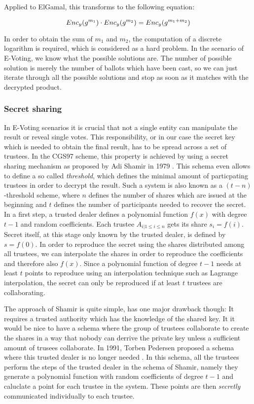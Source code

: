 \documentclass[numbers=noenddot, abstract=on]{scrreprt}
\begin{document}
Applied to ElGamal, this transforms to the following equation:

\begin{equation}
Enc_y(g^{m_1}) \cdot Enc_y(g^{m_2}) = Enc_y(g^{m_1 + m_2}) \notag
\end{equation}

In order to obtain the sum of $m_1$ and $m_2$, the computation of a discrete
logarithm is required, which is considered as a hard problem. In the scenario of
E-Voting, we know what the possible solutions are. The number of possible
solution is merely the number of ballots which have been cast, so we can just
iterate through all the possible solutions and stop as soon as it matches with
the decrypted product.


\subsubsection{Secret sharing}
\label{sec:secretsharing}
In E-Voting scenarios it is crucial that not a
single entity can manipulate the result or reveal single votes. This
responsibility, or in our case the secret key which is needed to obtain the
final result, has to be spread across a set of trustees. In the CGS97 scheme,
this property is achieved by using a secret sharing mechanism as proposed by Adi
Shamir in 1979 \cite{SHA79}. This schema even allows to define a so called
\textit{threshold}, which defines the minimal amount of particpating trustees in
order to decrypt the result. Such a system is also known as a
$(t-n)$-threshold scheme, where $n$ defines the number of shares which are
issued at the beginning and $t$ defines the number of participants needed to
recover the secret. In a first step, a trusted dealer defines a polynomial
function $f(x)$ with degree $t-1$ and random coefficients. Each trustee $A_{i |
1 \leq i \leq n}$ gets its share $s_i=f(i)$. Secret itself, at this stage only
known by the trusted dealer, is defined by $s=f(0)$. In order to reproduce the
secret using the shares distributed among all trustees, we can interpolate the
shares in order to reproduce the coefficients and therefore also $f(x)$. Since a
polynomial function of degree $t-1$ needs at least $t$ points to reproduce using
an interpolation technique such as Lagrange interpolation, the secret can only
be reproduced if at least $t$ trustees are collaborating. 

The approach of Shamir is quite simple, has one major drawback though: It
requires a trusted authority which has the knowledge of the shared key. It it
would be nice to have a schema where the group of trustees collaborate to create
the shares in a way that nobody can derrive the private key unless a sufficient
amount of trusees collaborate. In 1991, Torben Pedersen proposed a schema where
this trusted dealer is no longer needed \cite{PED91}. In this schema, all the
trustees perform the steps of the trusted dealer in the schema of Shamir, namely
they generate a polynomial function with random coefficients of degree $t-1$ and
caluclate a point for each trustee in the system. These points are then
\textit{secretly} communicated individually to each trustee.
\end{document}
